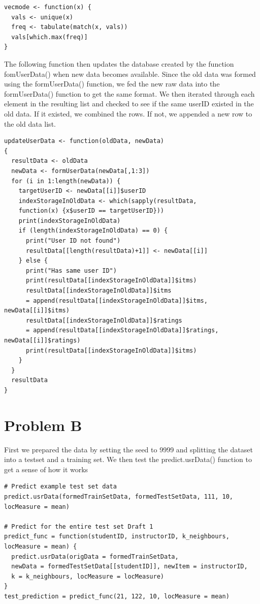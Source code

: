 \documentclass{article}
\begin{document}
\begin{verbatim}
vecmode <- function(x) {
  vals <- unique(x)
  freq <- tabulate(match(x, vals))
  vals[which.max(freq)]
}
\end{verbatim}

The following function then updates the database created by the function fomUserData() when new data becomes available. Since the old data was formed using the formUserData() function, we fed the new raw data into the formUserData() function to get the same format. We then iterated through each element in the resulting list and checked to see if the same userID existed in the old data. If it existed, we combined the rows. If not, we appended a new row to the old data list. 

\begin{verbatim}
updateUserData <- function(oldData, newData)
{
  resultData <- oldData
  newData <- formUserData(newData[,1:3])
  for (i in 1:length(newData)) {
    targetUserID <- newData[[i]]$userID
    indexStorageInOldData <- which(sapply(resultData, 
    function(x) {x$userID == targetUserID}))
    print(indexStorageInOldData)
    if (length(indexStorageInOldData) == 0) {
      print("User ID not found")
      resultData[[length(resultData)+1]] <- newData[[i]]
    } else {
      print("Has same user ID")
      print(resultData[[indexStorageInOldData]]$itms)
      resultData[[indexStorageInOldData]]$itms 
      = append(resultData[[indexStorageInOldData]]$itms, newData[[i]]$itms)
      resultData[[indexStorageInOldData]]$ratings 
      = append(resultData[[indexStorageInOldData]]$ratings, newData[[i]]$ratings)
      print(resultData[[indexStorageInOldData]]$itms)
    }
  }
  resultData
}
\end{verbatim}

\section{Problem B}
First we prepared the data by setting the seed to 9999 and splitting the dataset into a testset and a training set. We then test the predict.usrData() function to get a sense of how it works

\begin{verbatim}
# Predict example test set data
predict.usrData(formedTrainSetData, formedTestSetData, 111, 10, locMeasure = mean)

# Predict for the entire test set Draft 1
predict_func = function(studentID, instructorID, k_neighbours, locMeasure = mean) {
  predict.usrData(origData = formedTrainSetData, 
  newData = formedTestSetData[[studentID]], newItem = instructorID, 
  k = k_neighbours, locMeasure = locMeasure)
}
test_prediction = predict_func(21, 122, 10, locMeasure = mean)
\end{verbatim}
\end{document}
